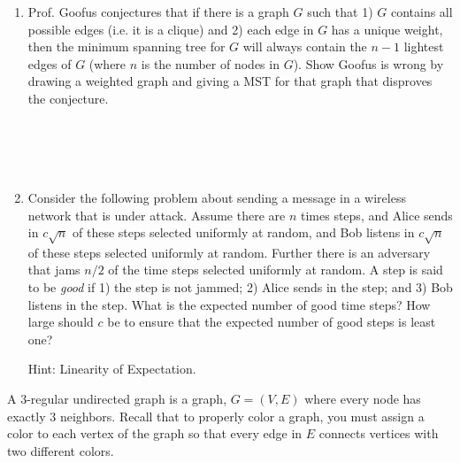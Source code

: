 \documentclass[11pt]{article}
\newcommand{\ans}[1]{}
\begin{document}
\begin{enumerate}
\begin{enumerate}
\end{enumerate}



\begin{enumerate}

\item Prof. Goofus conjectures that if there is a graph $G$ such that 1) $G$ contains all possible edges (i.e. it is a clique) and 2) each edge in $G$ has a unique weight, then the minimum spanning tree for $G$ will always contain the $n-1$ lightest edges of $G$ (where $n$ is the number of nodes in $G$).  Show Goofus is wrong by drawing a weighted graph and  giving a MST for that graph that disproves the conjecture. \ans{Nodes are a,b,c, d and e.  Edges are (a,b), (b,c) (a,b), (d,e) with weight 1, (b,d) with weight 10.  The MST always contains the edge (b,d).} \\ \ \\ \ \\ \ \\ \ \\


\pagebreak

\item Consider the following problem about sending a message in a wireless network that is under attack.   Assume there are $n$ times steps, and Alice sends in $c\sqrt{n}$ of these steps selected uniformly at random, and Bob listens in $c\sqrt{n}$ of these steps selected uniformly at random.  Further there is an adversary that jams $n/2$ of the time steps selected uniformly at random.  A step is said to be \emph{good} if 1) the step is not jammed; 2) Alice sends in the step; and 3) Bob listens in the step.  What is the expected number of good time steps?  How large should $c$ be to ensure that the expected number of good steps is least one?

Hint: Linearity of Expectation.

\ans{For each step $i$, let $X_{i}$ be an r.v. that is $1$ if the step is good and $0$ otherwise.  Note that $E(X_{i}) = (c/\sqrt{n})(c/\sqrt{n})(1/2)  = c^{2}/2n$.  Let $X$ be the total number of good steps.  By linearity, $E(x) = n (c^{2}/2n) = c^{2}/2$.  Thus we want $c \geq \sqrt{2}$ to ensure that the expected number of good steps is at least $1$.}


\end{enumerate}





 A $3$-regular undirected graph is a graph, $G=(V,E)$ where every node has exactly $3$ neighbors.  Recall that to properly color a graph, you must assign a color to each vertex of the graph so that every edge in $E$ connects vertices with two different colors.


\end{enumerate}
\end{document}
